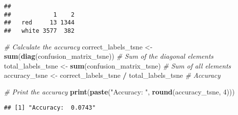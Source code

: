 \documentclass[
]{article}
\newenvironment{Shaded}{\begin{snugshade}}{\end{snugshade}}
\newcommand{\AttributeTok}[1]{\textcolor[rgb]{0.13,0.29,0.53}{#1}}
\newcommand{\CommentTok}[1]{\textcolor[rgb]{0.56,0.35,0.01}{\textit{#1}}}
\newcommand{\DecValTok}[1]{\textcolor[rgb]{0.00,0.00,0.81}{#1}}
\newcommand{\FunctionTok}[1]{\textcolor[rgb]{0.13,0.29,0.53}{\textbf{#1}}}
\newcommand{\NormalTok}[1]{#1}
\newcommand{\OtherTok}[1]{\textcolor[rgb]{0.56,0.35,0.01}{#1}}
\newcommand{\SpecialCharTok}[1]{\textcolor[rgb]{0.81,0.36,0.00}{\textbf{#1}}}
\newcommand{\StringTok}[1]{\textcolor[rgb]{0.31,0.60,0.02}{#1}}
\begin{document}
\begin{Shaded}
\end{Shaded}

\begin{verbatim}
##        
##            1    2
##   red     13 1344
##   white 3577  382
\end{verbatim}

\begin{Shaded}
\begin{Highlighting}[]
\CommentTok{\# Calculate the accuracy}
\NormalTok{correct\_labels\_tsne }\OtherTok{\textless{}{-}} \FunctionTok{sum}\NormalTok{(}\FunctionTok{diag}\NormalTok{(confusion\_matrix\_tsne))  }\CommentTok{\# Sum of the diagonal elements}
\NormalTok{total\_labels\_tsne }\OtherTok{\textless{}{-}} \FunctionTok{sum}\NormalTok{(confusion\_matrix\_tsne)  }\CommentTok{\# Sum of all elements}
\NormalTok{accuracy\_tsne }\OtherTok{\textless{}{-}}\NormalTok{ correct\_labels\_tsne }\SpecialCharTok{/}\NormalTok{ total\_labels\_tsne  }\CommentTok{\# Accuracy}

\CommentTok{\# Print the accuracy}
\FunctionTok{print}\NormalTok{(}\FunctionTok{paste}\NormalTok{(}\StringTok{"Accuracy: "}\NormalTok{, }\FunctionTok{round}\NormalTok{(accuracy\_tsne, }\DecValTok{4}\NormalTok{)))}
\end{Highlighting}
\end{Shaded}

\begin{verbatim}
## [1] "Accuracy:  0.0743"
\end{verbatim}
\end{document}
